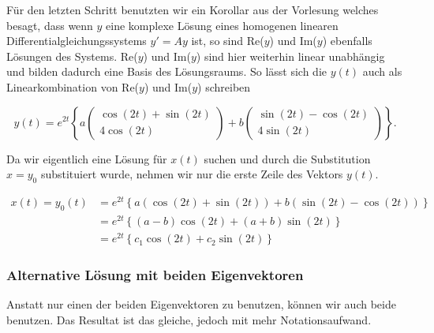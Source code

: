 Für den letzten Schritt benutzten wir ein Korollar aus der Vorlesung welches besagt, dass wenn \( y \) eine komplexe Lösung eines homogenen linearen Differentialgleichungssystems \( y'=Ay \) ist, so sind Re(\(y\)) und Im(\(y\)) ebenfalls Lösungen des Systems. Re(\(y\)) und Im(\(y\)) sind hier weiterhin linear unabhängig und bilden dadurch eine Basis des Lösungsraums. So lässt sich die \( y(t) \) auch als Linearkombination von Re(\(y\)) und Im(\(y\)) schreiben

\begin{equation*}
    y(t) = e^{2t} \left\{ a \begin{pmatrix}
        \cos(2t) + \sin(2t) \\
        4 \cos(2t)
    \end{pmatrix} + b \begin{pmatrix}
        \sin(2t) - \cos(2t) \\
        4 \sin(2t)
    \end{pmatrix} \right\}.
\end{equation*}

Da wir eigentlich eine Lösung für \( x(t) \) suchen und durch die Substitution \( x = y_0 \) substituiert wurde, nehmen wir nur die erste Zeile des Vektors \( y(t) \). 

\begin{equation*}
    \begin{aligned}
    x(t) = y_0(t) &= e^{2t} \left\{ a ( \cos(2t) + \sin(2t) ) + b ( \sin(2t) - \cos(2t) ) \right\} \\[0.5em]
    &= e^{2t} \left\{ (a-b) \cos(2t) + (a+b) \sin(2t) \right\} \\[0.5em]
    &= e^{2t} \left\{ c_1 \cos(2t) + c_2 \sin(2t) \right\} 
    \end{aligned}
\end{equation*}

\subsubsection{Alternative Lösung mit beiden Eigenvektoren}

Anstatt nur einen der beiden Eigenvektoren zu benutzen, können wir auch beide benutzen. Das Resultat ist das gleiche, jedoch mit mehr Notationsaufwand.

